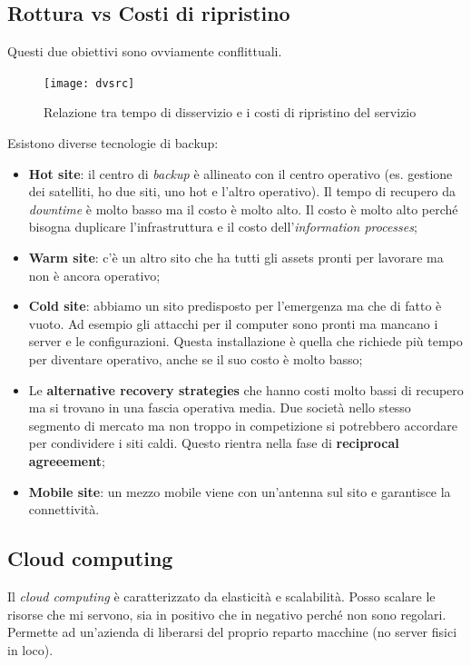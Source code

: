 \subsection{Rottura vs Costi di ripristino}

Questi due obiettivi sono ovviamente conflittuali.

\begin{figure}[H]
 \centering
 \texttt{[image: dvsrc]}
 \caption{Relazione tra tempo di disservizio e i costi di ripristino del servizio}
\end{figure}

Esistono diverse tecnologie di backup:
\begin{itemize}
  \item \textbf{Hot site}: il centro di \textit{backup} è allineato con il
  centro operativo (es. gestione dei satelliti, ho due siti, uno hot e l'altro
  operativo). Il tempo di recupero da \textit{downtime} è molto basso ma il
  costo è molto alto. Il costo è molto alto perché bisogna duplicare
  l'infrastruttura e il costo dell'\textit{information processes};
  \item \textbf{Warm site}: c'è un altro sito che ha tutti gli assets pronti
  per lavorare ma non è ancora operativo;
  \item \textbf{Cold site}: abbiamo un sito predisposto per l'emergenza ma che
  di fatto è vuoto. Ad esempio gli attacchi per il computer sono pronti ma
  mancano i server e le configurazioni. Questa installazione è quella che
  richiede più tempo per diventare operativo, anche se il suo costo è molto
  basso;
  \item Le \textbf{alternative recovery strategies} che hanno costi molto bassi
  di recupero ma si trovano in una fascia operativa media. Due società nello
  stesso segmento di mercato ma non troppo in competizione si potrebbero
  accordare per condividere i siti caldi. Questo rientra nella fase di
  \textbf{reciprocal agreeement};
  \item \textbf{Mobile site}: un mezzo mobile viene con un'antenna sul sito e
  garantisce la connettività.
\end{itemize}


\subsection{Cloud computing}

Il \textit{cloud computing} è caratterizzato da elasticità e scalabilità. Posso
scalare le risorse che mi servono, sia in positivo che in negativo perché non
sono regolari. Permette ad un'azienda di liberarsi del proprio reparto macchine
(no server fisici in loco).

